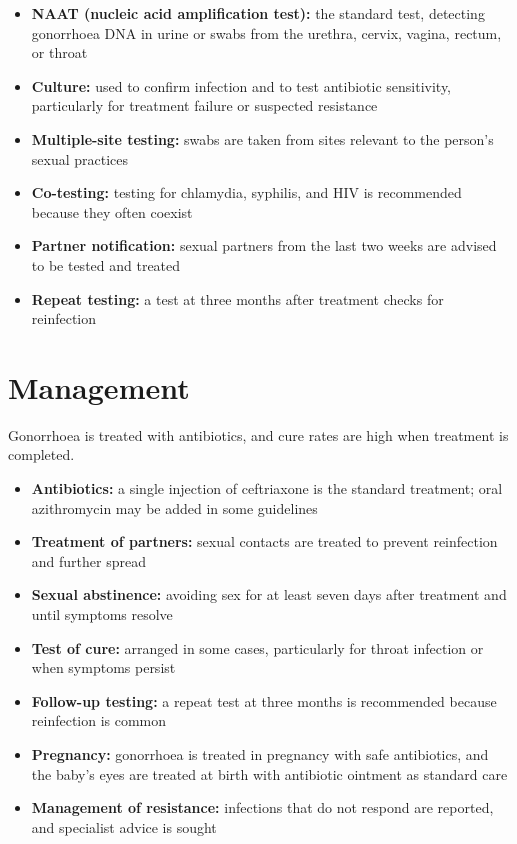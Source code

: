 \begin{itemize}
    \item \textbf{NAAT (nucleic acid amplification test):} the standard test, detecting gonorrhoea DNA in urine or swabs from the urethra, cervix, vagina, rectum, or throat
    \item \textbf{Culture:} used to confirm infection and to test antibiotic sensitivity, particularly for treatment failure or suspected resistance
    \item \textbf{Multiple-site testing:} swabs are taken from sites relevant to the person's sexual practices
    \item \textbf{Co-testing:} testing for chlamydia, syphilis, and HIV is recommended because they often coexist
    \item \textbf{Partner notification:} sexual partners from the last two weeks are advised to be tested and treated
    \item \textbf{Repeat testing:} a test at three months after treatment checks for reinfection
\end{itemize}

\section*{Management}
Gonorrhoea is treated with antibiotics, and cure rates are high when treatment is completed.

\begin{itemize}
    \item \textbf{Antibiotics:} a single injection of ceftriaxone is the standard treatment; oral azithromycin may be added in some guidelines
    \item \textbf{Treatment of partners:} sexual contacts are treated to prevent reinfection and further spread
    \item \textbf{Sexual abstinence:} avoiding sex for at least seven days after treatment and until symptoms resolve
    \item \textbf{Test of cure:} arranged in some cases, particularly for throat infection or when symptoms persist
    \item \textbf{Follow-up testing:} a repeat test at three months is recommended because reinfection is common
    \item \textbf{Pregnancy:} gonorrhoea is treated in pregnancy with safe antibiotics, and the baby's eyes are treated at birth with antibiotic ointment as standard care
    \item \textbf{Management of resistance:} infections that do not respond are reported, and specialist advice is sought
\end{itemize}

